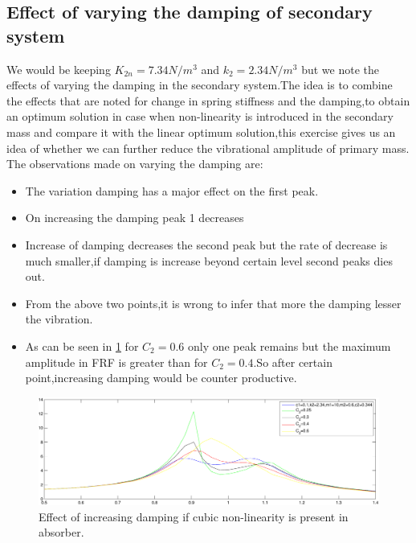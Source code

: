   \subsection{Effect of varying the damping of secondary system }
  We would be keeping $K_{2n}=7.34 N/m^3 $ and $k_2 =2.34 N/m^3$ but we note the effects of varying the damping in the secondary system.The idea is to combine the effects that are noted for change in spring stiffness and the damping,to obtain an optimum solution in case when non-linearity is introduced in the secondary mass and compare it with the linear optimum solution,this exercise gives us an idea of whether we can further reduce the vibrational amplitude of primary mass.
  The observations made on varying the damping are:
  \begin{itemize}
  \item The variation damping has a major effect on the first peak.
  \item On increasing the damping peak 1 decreases
  \item Increase of damping decreases the second peak but the rate of decrease is much smaller,if damping is increase beyond certain level second peaks dies out.
  \item From the above two points,it is wrong to infer that more the damping lesser the vibration.
  \item As can be seen in \ref{fig:non-linear secondary 3} for $C_2=0.6$ only one peak remains but the maximum amplitude in FRF is greater than for $C_2=0.4$.So after certain point,increasing damping would be counter productive.
  \end{itemize}
  \begin{figure}[h!]
  \includegraphics[width=\textwidth,height=0.5\textwidth]{"figures/nonlinearity_secondary_3"}
  \caption{Effect of increasing damping if cubic non-linearity is present in absorber.}
  \label{fig:non-linear secondary 3}
  \end{figure}
